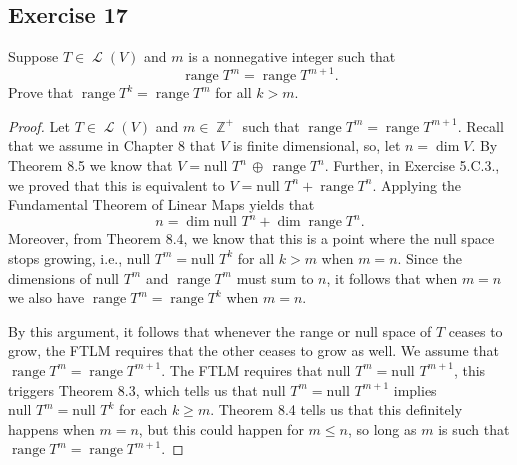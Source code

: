 \documentclass[letterpaper, 12pt]{amsart}
\DeclareMathOperator{\Z}{\mathbb{Z}}				%
\DeclareMathOperator{\Ell}{\mathscr{L}}				%
\renewcommand{\null}{\text{null }}					%
\DeclareMathOperator{\range}{\text{range }}			%
\theoremstyle{definition}  							%
\begin{document}
		\subsection*{Exercise 17}
		Suppose $T \in \Ell(V)$ and $m$ is a nonnegative integer such that $$\range T^{m} = \range T^{m+1}.$$
		Prove that $\range T^k = \range T^m$ for all $k > m$.

		\begin{proof}
		Let $T \in \Ell(V)$ and $m \in \Z^{+}$ such that $\range T^m = \range T^{m+1}$.
		Recall that we assume in Chapter 8 that $V$ is finite dimensional, so, let $n = \dim V$.
		By Theorem 8.5 we know that $V = \null T^n  \, \oplus \, \range T^n$.
		Further, in Exercise 5.C.3., we proved that this is equivalent to $V = \null T^n + \range T^n$.
		Applying the Fundamental Theorem of Linear Maps yields that $$n = \dim \null T^n + \dim \range T^n.$$
		Moreover, from Theorem 8.4, we know that this is a point where the null space stops growing, i.e., $\null T^{m} = \null T^{k}$ for all $k > m$ when $m = n$.
		Since the dimensions of $\null T^{m}$ and $\range T^{m}$ must sum to $n$, it follows that when $m = n$ we also have $\range T^{m} = \range T^{k}$ when $m = n$.

		By this argument, it follows that whenever the range or null space of $T$ ceases to grow, the FTLM requires that the other ceases to grow as well.
		We assume that $\range T^{m} = \range T^{m+1}$.
		The FTLM requires that $\null T^{m} = \null T^{m+1}$, this triggers Theorem 8.3, which tells us that $\null T^m = \null T^{m+1}$ implies $\null T^m = \null T^k$ for each $k \geq m$.
		Theorem 8.4 tells us that this definitely happens when $m = n$, but this could happen for $m \leq n$, so long as $m$ is such that $\range T^{m} = \range T^{m+1}$.
		\end{proof}
\end{document}

